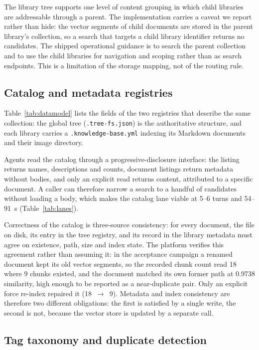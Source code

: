 The library tree supports one level of content grouping in which child
libraries are addressable through a parent. The implementation carries a
caveat we report rather than hide: the vector segments of child documents are
stored in the parent library's collection, so a search that targets a child
library identifier returns no candidates. The shipped operational guidance is
to search the parent collection and to use the child libraries for navigation
and scoping rather than as search endpoints. This is a limitation of the
storage mapping, not of the routing rule.

\subsection{Catalog and metadata registries}
\label{sec:org-registries}

Table~\ref{tab:datamodel} lists the fields of the two registries that
describe the same collection: the global tree (\texttt{.tree-fs.json}) is the
authoritative structure, and each library carries a
\texttt{.knowledge-base.yml} indexing its Markdown documents and their image
directory.

Agents read the catalog through a progressive-disclosure interface: the
listing returns names, descriptions and counts, document listings return
metadata without bodies, and only an explicit read returns content,
attributed to a specific document. A caller can therefore narrow a search to
a handful of candidates without loading a body, which makes the catalog lane
viable at 5--6 turns and 54--91~s (Table~\ref{tab:lanes}).

Correctness of the catalog is three-source consistency: for every document,
the file on disk, its entry in the tree registry, and its record in the
library metadata must agree on existence, path, size and index state. The
platform verifies this agreement rather than assuming it: in the acceptance
campaign a renamed document kept its old vector segments, so the recorded
chunk count read 18 where 9 chunks existed, and the document matched its own
former path at 0.9738 similarity, high enough to be reported as a
near-duplicate pair. Only an explicit force re-index repaired it
(18~$\rightarrow$~9). Metadata and index consistency are therefore two
different obligations: the first is satisfied by a single write, the second
is not, because the vector store is updated by a separate call.

\subsection{Tag taxonomy and duplicate detection}
\label{sec:org-tags}
\label{sec:org-dedup}

